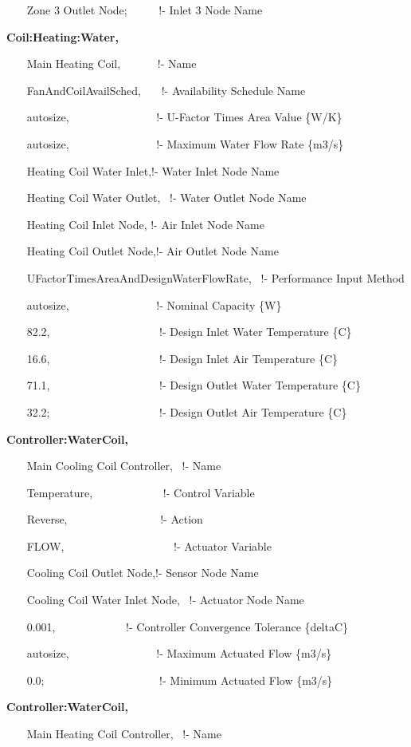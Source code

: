 ~~~ Zone 3 Outlet Node;~~~~~ !- Inlet 3 Node Name

\textbf{Coil:Heating:Water,}

~~~ Main Heating Coil,~~~~~~ !- Name

~~~ FanAndCoilAvailSched,~~~ !- Availability Schedule Name

~~~ autosize,~~~~~~~~~~~~~~~ !- U-Factor Times Area Value \{W/K\}

~~~ autosize,~~~~~~~~~~~~~~~ !- Maximum Water Flow Rate \{m3/s\}

~~~ Heating Coil Water Inlet,!- Water Inlet Node Name

~~~ Heating Coil Water Outlet,~ !- Water Outlet Node Name

~~~ Heating Coil Inlet Node, !- Air Inlet Node Name

~~~ Heating Coil Outlet Node,!- Air Outlet Node Name

~~~ UFactorTimesAreaAndDesignWaterFlowRate,~ !- Performance Input Method

~~~ autosize,~~~~~~~~~~~~~~~ !- Nominal Capacity \{W\}

~~~ 82.2,~~~~~~~~~~~~~~~~~~~ !- Design Inlet Water Temperature \{C\}

~~~ 16.6,~~~~~~~~~~~~~~~~~~~ !- Design Inlet Air Temperature \{C\}

~~~ 71.1,~~~~~~~~~~~~~~~~~~~ !- Design Outlet Water Temperature \{C\}

~~~ 32.2;~~~~~~~~~~~~~~~~~~~ !- Design Outlet Air Temperature \{C\}

\textbf{Controller:WaterCoil,}

~~~ Main Cooling Coil Controller,~ !- Name

~~~ Temperature,~~~~~~~~~~~~ !- Control Variable

~~~ Reverse,~~~~~~~~~~~~~~~~ !- Action

~~~ FLOW,~~~~~~~~~~~~~~~~~~~ !- Actuator Variable

~~~ Cooling Coil Outlet Node,!- Sensor Node Name

~~~ Cooling Coil Water Inlet Node, ~!- Actuator Node Name

~~~ 0.001,~~~~~~~~~~~~ !- Controller Convergence Tolerance \{deltaC\}

~~~ autosize,~~~~~~~~~~~~~~~ !- Maximum Actuated Flow \{m3/s\}

~~~ 0.0;~~~~~~~~~~~~~~~~~~~~ !- Minimum Actuated Flow \{m3/s\}

\textbf{Controller:WaterCoil,}

~~~ Main Heating Coil Controller,~ !- Name

